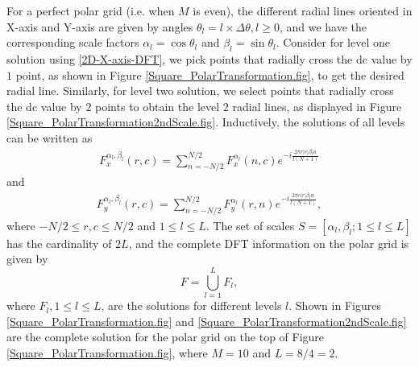 \documentclass{UCF_ETD}
\begin{document}
 
  For a perfect polar grid  (i.e. when $M$ is even), the different radial lines oriented in X-axis and Y-axis are given by angles $\theta_l = l \times \Delta \theta, l\ge 0$, and we have the corresponding scale factors $\alpha_l = \cos\theta_l$ and $\beta_l = \sin\theta_l$. Consider for level one solution using \eqref{2D-X-axis-DFT}, we pick points that radially cross the dc  value by $1$ point, as shown in Figure \ref{Square_PolarTransformation.fig}, to get the desired radial line. Similarly, for level two solution,  we select points that radially cross the dc value by $2$ points  to obtain the level $2$ radial lines, as displayed in Figure \ref{Square_PolarTransformation2ndScale.fig}.  Inductively, the solutions of all levels can  be written as
 \begin{eqnarray} \label{2D-X-axis-DFT_allLevels}
 F^{\alpha_l, \beta_l }_x(r,c) = \sum\limits_{n=-N/2}^{N/2}F^{\alpha_l}_x (n,c) e^{-i\frac{2\pi r |c| \beta_l n}{l(N+1)}}
 \end{eqnarray}
 and
 \begin{eqnarray} \label{2D-Y-axis-DFT_allLevels}
 F^{ \alpha_l, \beta_l }_y(r,c) = \sum\limits_{n=-N/2}^{N/2}F^{\alpha_l}_y (r,n) e^{-i\frac{2\pi c |r|\beta_l n}{l(N+1)}},
 \end{eqnarray}
 where $-N/2 \leq r,  c \leq N/2$ and $1 \leq l \leq L$.
 The set of scales  $S = [\alpha_l , \beta_l; 1\leq l \leq L]$ has the cardinality of $2L$,
  and the complete DFT information on the polar grid is given by
 \begin{equation} \label{2D-Fast-Polar-FT-union}
 F = \bigcup_{l=1}^{L} F_l,
 \end{equation}
 where $F_l, 1\le l\le L$, are the solutions for different levels $l$.
 Shown in Figures \ref{Square_PolarTransformation.fig} and \ref{Square_PolarTransformation2ndScale.fig}
 are the complete solution for the polar grid on the top  of Figure  \ref{Square_PolarTransformation.fig},
 where
 $M = 10$  and $L = 8/4 = 2$.
\end{document}
